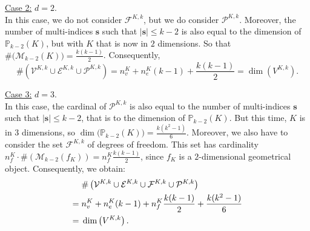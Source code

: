 \noindent \underline{Case 2:} $d=2$.\\
\noindent In this case, we do not consider $\mathcal{F}^{K,k}$, but we do consider $\mathcal{P}^{K,k}$. Moreover, the number of multi-indices $\mathbf{s}$ such that $|\mathbf{s}|\leq k-2$ is also equal to the dimension of $\mathbb{P}_{k-2}(K)$, but with $K$ that is now in $2$ dimensions. So that $\#\big(\mathcal{M}_{k-2}(K)\big) = \frac{k(k-1)}{2}$. Consequently, 
$$\#\left(\mathcal{V}^{K,k}\cup \mathcal{E}^{K,k} \cup\mathcal{P}^{K,k}\right)=n_v^K
+ n_e^K(k-1) + \frac{k(k-1)}{2}= \dim\left(V^{K,k}\right).
$$

\noindent \underline{Case 3:} $d=3$.\\
\noindent In this case, the cardinal of $\mathcal{P}^{K,k}$ is also equal to the number of multi-indices $\mathbf{s}$ such that $|\mathbf{s}|\leq k-2$, that is to the dimension of $\mathbb{P}_{k-2}(K)$. But this time, $K$ is in $3$ dimensions, so $\dim\big(\mathbb{P}_{k-2}(K)\big) = \frac{k(k^2-1)}{6}.$ Moreover, we also have to consider the set $\mathcal{F}^{K,k}$ of degrees of freedom. This set has cardinality $n_f^K\cdot\#\left(\mathcal{M}_{k-2}(f_K)\right) = n_f^K\frac{k(k-1)}{2}$, since $f_K$ is a $2$-dimensional geometrical object. Consequently, we obtain:
\begin{align*}
&\#\left(\mathcal{V}^{K,k}\cup \mathcal{E}^{K,k}\cup\mathcal{F}^{K,k} \cup\mathcal{P}^{K,k}\right)\\
= \hspace{1mm}&n_v^K
+ n_e^K(k-1) + n_f^K\frac{k(k-1)}{2} + \frac{k(k^2-1)}{6}\\
= \hspace{1mm}&\dim\left(V^{K,k}\right).
\end{align*}